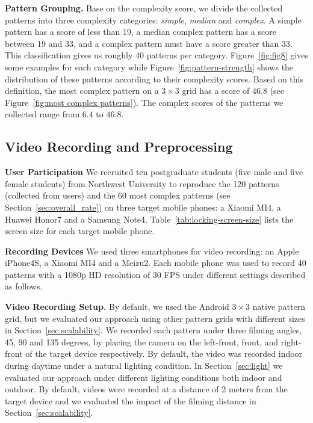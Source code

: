     \vspace{2mm}
    \noindent \textbf{Pattern Grouping.}
    Base on the complexity score, we divide the collected patterns into three complexity categories: \emph{simple}, \emph{median} and \emph{complex}. A simple pattern has a score of less than 19,
    a median
    complex pattern has a score between 19 and 33, and a complex pattern must have a score greater than 33. This classification gives us roughly 40 patterns per
    category. Figure~\ref{fig:fig8} gives some examples for each category while Figure~\ref{fig:pattern-strength} shows the distribution of these patterns according to their complexity scores.
    Based on this definition, the most complex pattern on a $3 \times 3$ grid has a score of $46.8$ (see Figure~\ref{fig:most complex patterns}).  The complex scores of the patterns we collected range from $6.4$ to $46.8$.


    \subsection{Video Recording and Preprocessing}
    
    \noindent\textbf{User Participation} We recruited ten postgraduate students (five male and five female
    students) from Northwest University to reproduce the 120 patterns (collected from users)
    and the 60 most complex patterns (see Section~\ref{sec:overall_rate})  on three target mobile phones:
    a Xiaomi MI4, a Huawei Honor7 and a Samsung Note4. Table~\ref{tab:locking-screen-size} lists
    the screen size for each target mobile phone.

    \vspace{2mm}
    \noindent\textbf{Recording Devices} We used three smartphones for video recording: an Apple iPhone4S,
     a Xiaomi MI4 and a Meizu2. Each mobile phone was used to record 40 patterns with a
    1080p HD resolution of 30 FPS under different settings described as follows.

    \vspace{2mm}
   \noindent\textbf{Video Recording Setup.}
    By default, we used the  Android $3 \times 3$ native pattern grid,
    but we evaluated our approach using other pattern grids with different sizes in
    Section~\ref{sec:scalability}. We recorded each pattern under three filming
    angles, 45, 90 and 135 degrees, by placing the camera on the left-front, front, and right-front
    of the target device respectively.
    By default, the video
    was recorded indoor during daytime under a natural lighting condition. In
    Section~\ref{sec:light} we evaluated our approach under different lighting conditions
    both indoor and outdoor. By default, videos were recorded at a distance of
    2 meters from the target device and we evaluated the impact of the filming distance in
    Section~\ref{sec:scalability}.

